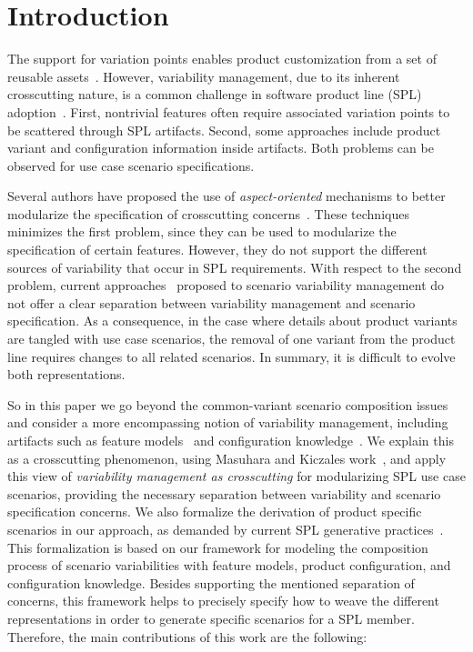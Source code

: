 \documentclass{acm_proc_article-sp}
\begin{document}


\section{Introduction}
The support for variation points enables product customization from a set of
reusable assets~\cite{Pohl:2005aa}. However, variability management, due to its
inherent crosscutting nature, is a common challenge in software product line
(SPL) adoption~\cite{Clements:2001aa,Pohl:2005aa}. First, nontrivial features
often require associated variation points to be scattered through SPL artifacts.
Second, some approaches include product variant and configuration information
inside artifacts.
Both problems can be observed for use case scenario specifications.

Several authors have proposed the use of
\emph{aspect-oriented} mechanisms to better modularize the specification of crosscutting concerns~\cite{Moreira:2004aa,Chitchyan:2007aa}. These techniques minimizes the first problem, since they can be used to modularize the specification of certain features. However, they do not support the different sources of variability that occur in SPL requirements. With respect to the second problem, current
approaches~\cite{Griss:1998aa,Bertolino:2003aa,Eriksson:2005aa} proposed to scenario variability management do not offer a
clear separation between variability management and scenario specification. As a
consequence, in the case where details about product variants are tangled with
use case scenarios, the removal of one variant from the product line requires
changes to all related scenarios. In summary, it is difficult to evolve both
representations.

So in this paper we go beyond the common-variant scenario composition issues and
consider a more encompassing notion of variability management, including
artifacts such as feature models~\cite{Gheyi:2006aa,Czarnecki:2000aa} and
configuration knowledge~\cite{Czarnecki:2000aa,Pohl:2005aa}. We explain this as a
crosscutting phenomenon, using Masuhara and Kiczales work~\cite{Masuhara:2003aa},
and apply this view of \emph{variability management as crosscutting} for
modularizing SPL use case scenarios, providing the necessary separation between
variability and scenario specification concerns. We also formalize the derivation
of product specific scenarios in our approach, as demanded by current SPL
generative practices~\cite{Krueger:2006aa}. This formalization is based on
our framework for modeling the composition process of scenario variabilities with
feature models, product configuration, and configuration knowledge. Besides supporting the mentioned separation of
concerns, this framework helps to precisely specify how to weave the different
representations in order to generate specific scenarios for a SPL member.
Therefore, the main contributions of this work are the following:
\end{document}
